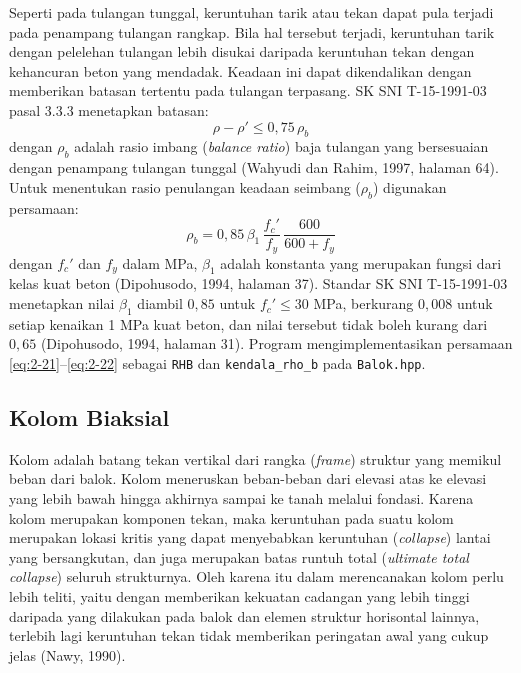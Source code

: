Seperti pada tulangan tunggal, keruntuhan tarik atau tekan dapat pula
terjadi pada penampang tulangan rangkap. Bila hal tersebut terjadi,
keruntuhan tarik dengan pelelehan tulangan lebih disukai daripada
keruntuhan tekan dengan kehancuran beton yang mendadak. Keadaan ini dapat
dikendalikan dengan memberikan batasan tertentu pada tulangan terpasang.
SK SNI T-15-1991-03 pasal 3.3.3 menetapkan batasan:
\begin{equation}
\rho - \rho' \le 0{,}75\,\rho_b
\label{eq:2-21}
\end{equation}
dengan $\rho_b$ adalah rasio imbang (\textit{balance ratio}) baja tulangan
yang bersesuaian dengan penampang tulangan tunggal (Wahyudi dan Rahim,
1997, halaman 64). Untuk menentukan rasio penulangan keadaan seimbang
($\rho_b$) digunakan persamaan:
\begin{equation}
\rho_b = 0{,}85\,\beta_1\,\frac{f_c'}{f_y}\,\frac{600}{600+f_y}
\label{eq:2-22}
\end{equation}
dengan $f_c'$ dan $f_y$ dalam MPa, $\beta_1$ adalah konstanta yang
merupakan fungsi dari kelas kuat beton (Dipohusodo, 1994, halaman 37).
Standar SK SNI T-15-1991-03 menetapkan nilai $\beta_1$ diambil $0{,}85$
untuk $f_c' \le 30$ MPa, berkurang $0{,}008$ untuk setiap kenaikan 1 MPa
kuat beton, dan nilai tersebut tidak boleh kurang dari $0{,}65$
(Dipohusodo, 1994, halaman 31). Program mengimplementasikan persamaan
\eqref{eq:2-21}--\eqref{eq:2-22} sebagai \texttt{RHB} dan
\texttt{kendala\_rho\_b} pada \texttt{Balok.hpp}.

\subsection{Kolom Biaksial}

Kolom adalah batang tekan vertikal dari rangka (\textit{frame}) struktur
yang memikul beban dari balok. Kolom meneruskan beban-beban dari elevasi
atas ke elevasi yang lebih bawah hingga akhirnya sampai ke tanah melalui
fondasi. Karena kolom merupakan komponen tekan, maka keruntuhan pada suatu
kolom merupakan lokasi kritis yang dapat menyebabkan keruntuhan
(\textit{collapse}) lantai yang bersangkutan, dan juga merupakan batas
runtuh total (\textit{ultimate total collapse}) seluruh strukturnya. Oleh
karena itu dalam merencanakan kolom perlu lebih teliti, yaitu dengan
memberikan kekuatan cadangan yang lebih tinggi daripada yang dilakukan
pada balok dan elemen struktur horisontal lainnya, terlebih lagi
keruntuhan tekan tidak memberikan peringatan awal yang cukup jelas (Nawy,
1990).

